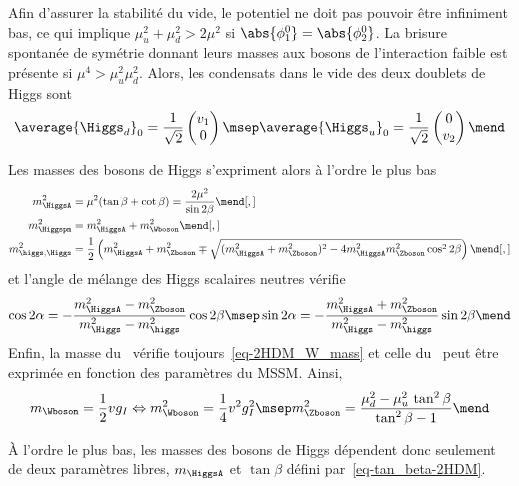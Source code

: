 \vspace{.5\baselineskip}\par\noindent
Afin d'assurer la stabilité du vide, le potentiel ne doit pas pouvoir être infiniment bas, ce qui implique $\mu_u^2+\mu_d^2 > 2\mu^2$ si $\abs{\phi_1^0}=\abs{\phi_2^0}$.
La brisure spontanée de symétrie donnant leurs masses aux bosons de l'interaction faible est présente si $\mu^4>\mu_u^2 \mu_d^2$.
Alors, les condensats dans le vide des deux doublets de Higgs sont
\begin{equation}
\average{\Higgs_d}_0 = \frac{1}{\sqrt{2}} \begin{pmatrix}v_1 \\ 0 \end{pmatrix}
\msep
\average{\Higgs_u}_0 = \frac{1}{\sqrt{2}} \begin{pmatrix} 0\\ v_2 \end{pmatrix}
\mend
\end{equation}
\par Les masses des bosons de Higgs s'expriment alors à l'ordre le plus bas
\begin{align}
m_{\HiggsA}^2 &= \mu^2 (\tan\beta+\cot\beta) = \frac{2\mu^2}{\sin 2\beta}
\mend[,] \label{eq-mA-MSSM}\\
m_{\Higgspm}^2 &= m_{\HiggsA}^2+m_{\Wboson}^2
\mend[,] \label{eq-mHpm-MSSM}\\
m_{\higgs,\Higgs}^2 &= \frac{1}{2} \left( m_{\HiggsA}^2+m_{\Zboson}^2 \mp \sqrt{(m_{\HiggsA}^2+m_{\Zboson}^2)^2-4m_{\HiggsA}^2m_{\Zboson}^2\cos^2 2\beta} \right)
\mend[,] \label{eq-mH0-MSSM}
\end{align}
et l'angle de mélange des Higgs scalaires neutres vérifie
\begin{equation}
\cos 2\alpha = - \frac{m_{\HiggsA}^2-m_{\Zboson}^2}{m_{\Higgs}^2-m_{\higgs}^2} \cos 2\beta
\msep
\sin 2\alpha = - \frac{m_{\HiggsA}^2+m_{\Zboson}^2}{m_{\Higgs}^2-m_{\higgs}^2} \sin 2\beta
\mend
\label{eq-Higgs_mixing_angle_MSSM}
\end{equation}
Enfin, la masse du \Wboson\ vérifie toujours~\eqref{eq-2HDM_W_mass} et celle du \Zboson\ peut être exprimée en fonction des paramètres du MSSM. Ainsi,
\begin{equation}
m_{\Wboson} = \frac{1}{2}vg_I
\Leftrightarrow
m_{\Wboson}^2 = \frac{1}{4}v^2g_I^2
\msep
m_{\Zboson}^2 = \frac{\mu_d^2 - \mu_u^2 \, \tan^2\beta}{\tan^2\beta-1}
\mend
\end{equation}
\par À l'ordre le plus bas, les masses des bosons de Higgs dépendent donc seulement de deux paramètres libres, $m_{\HiggsA}$ et $\tan\beta$ défini par~\eqref{eq-tan_beta-2HDM}.
